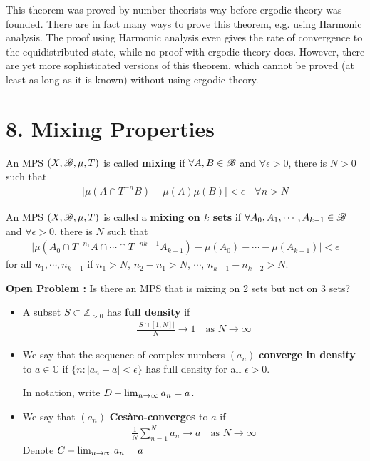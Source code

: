 \documentclass[10pt,a4paper]{report}
\begin{document}
This theorem was proved by number theorists way before ergodic theory was founded. There are in fact many ways to prove this theorem, e.g. using Harmonic analysis. The proof using Harmonic analysis even gives the rate of convergence to the equidistributed state, while no proof with ergodic theory does. However, there are yet more sophisticated versions of this theorem, which cannot be proved (at least as long as it is known) without using ergodic theory.
\s

\section*{8. Mixing Properties}

 An MPS $(X,\mathscr{B}, \mu,T)$ is called \textbf{mixing} if $\forall A,B\in \mathscr{B}$ and $\forall \epsilon>0$, there is $N>0$ such that
\begin{align*}
\Big| \mu(A\cap T^{-n}B) - \mu(A)\mu(B) \Big| < \epsilon \quad \forall n >N
\end{align*}
\s

 An MPS $(X,\mathscr{B}, \mu, T)$ is called a \textbf{mixing on $k$ sets} if $\forall A_0, A_1, \cdots,A_{k-1} \in \mathscr{B}$ and $\forall \epsilon >0$, there is $N$ such that
\begin{align*}
\Big| \mu(A_0 \cap T^{-n_1} A \cap \cdots \cap T^{-nk-1}A_{k-1}) - \mu(A_0) -\cdots -\mu(A_{k-1}) \Big| < \epsilon
\end{align*}
for all $n_1, \cdots, n_{k-1}$ if $n_1>N$, $n_2-n_1>N$, $\cdots$, $n_{k-1} - n_{k-2} >N$.
\s

\textbf{Open Problem :} Is there an MPS that is mixing on 2 sets but not on 3 sets?
\s

\begin{itemize}
\item A subset $S \subset \mathbb{Z}_{>0}$ has \textbf{full density} if
\begin{align*}
\frac{|S\cap [1,N]|}{N} \rightarrow 1 \quad \text{as } N\rightarrow \infty
\end{align*}
\item We say that the sequence of complex numbers $(a_n)$ \textbf{converge in density} to $a\in \mathbb{C}$ if $\{n: |a_n -a| <\epsilon \}$ has full density for all $\epsilon >0$.

In notation, write $D-\lim_{n\rightarrow \infty} a_n = a$.
\item We say that $(a_n)$ \textbf{Ces\`{a}ro-converges} to $a$ if
\begin{align*}
\frac{1}{N} \sum_{n=1}^N a_n \rightarrow a \quad \text{as } N\rightarrow \infty
\end{align*}
Denote $C-\lim_{n\rightarrow \infty} a_n= a$
\end{itemize}
\s
\end{document}
